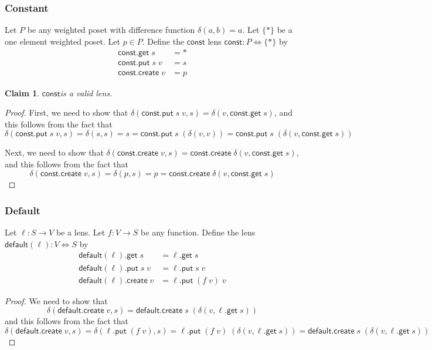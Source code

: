 \documentclass[acmsmall,review,anonymous]{acmart}\settopmatter{printfolios=true,printccs=false,printacmref=false}
\newtheorem{claim}{Claim}
\newcommand{\kw}[1]{\ensuremath{\mathsf{#1}}}
\newcommand{\get}{\ensuremath{\kw{get}}}
\newcommand{\pput}{\ensuremath{\kw{put}}}
\newcommand{\create}{\ensuremath{\kw{create}}}
\newcommand{\const}{\ensuremath{\kw{const}}}
\newcommand{\default}{\ensuremath{\kw{default}}}
\begin{document}
\subsubsection{Constant}
Let $P$ be any weighted poset with difference function $\delta(a, b) = a$.
Let $\{*\}$ be a one element weighted poset. Let $p \in P$. Define the \const
lens $\const : P \Leftrightarrow \{*\}$ by
\begin{align*}
\const.\get \; s &= *\\
\const.\pput \; s \; v &= s\\
\const.\create \; v &= p
\end{align*}
\begin{claim}
\const is a valid lens.
\end{claim}
\begin{proof}
First, we need to show that $\delta(\const.\pput \; s \;v, s) = \delta(v,
\const.\get \; s)$, and this follows from the fact that
$$\delta(\const.\pput \; s \;v, s) =
\delta(s, s) = s = \const.\pput \; s \; (\delta(v, v)) = \const.\pput \; s
\; (\delta(v, \const.\get \;s)) $$

Next, we need to show that $\delta(\const.\create \;v, s) =
\const.\create \; \delta(v, \const.\get \; s)$, and this follows from the fact
that
$$\delta(\const.\create \;v, s) = \delta(p, s) = p = \const.\create \; \delta(v,
\const.\get \; s)$$
\end{proof}
\subsubsection{Default}
Let $\ell : S \longrightarrow V$ be a lens. Let $f : V \longrightarrow S$ be any
function. Define the lens $\default(\ell) : V \Leftrightarrow S$ by
\begin{align*}
\default(\ell).\get \; s &= \ell.\get \; s\\
\default(\ell).\pput \; s \; v &= \ell.\pput \; s \; v\\
\default(\ell).\create \; v &= \ell.\pput \; (f \; v) \; v
\end{align*}
\begin{proof}
We need to show that
$$\delta(\default.\create \; v, s) = \default.\create \; s \; (\delta(v,
\ell.\get \; s))$$
and this follows from the fact that 
$$\delta(\default.\create \; v, s) = \delta(\ell.\pput \; (f \; v), s) =
\ell.\pput \; (f \; v) \; (\delta(v, \ell.\get \; s)) = \default.\create \; s
\; (\delta(v, \ell.\get \; s))$$
\end{proof}
\end{document}
